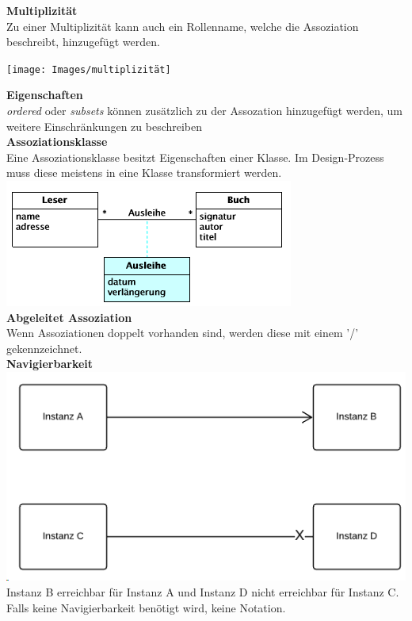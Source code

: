 \textbf{Multiplizität}\\
Zu einer Multiplizität kann auch ein Rollenname, welche die Assoziation beschreibt, hinzugefügt werden.
\begin{center}
	\texttt{[image: Images/multiplizität]}
\end{center}

\textbf{Eigenschaften}\\
\textit{ordered} oder \textit{subsets} können zusätzlich zu der Assozation hinzugefügt werden, um weitere Einschränkungen zu beschreiben\\

\textbf{Assoziationsklasse}\\
Eine Assoziationsklasse besitzt Eigenschaften einer Klasse. Im Design-Prozess muss diese meistens in eine Klasse transformiert werden.
\includegraphics[width=\columnwidth]{Images/assoziationsklasse}\\

\textbf{Abgeleitet Assoziation}\\
Wenn Assoziationen doppelt vorhanden sind,  werden diese mit einem '/' gekennzeichnet.\\

\textbf{Navigierbarkeit}\\
\includegraphics[width=\columnwidth]{Images/navigierbarkeit}
Instanz B erreichbar für Instanz A und Instanz D nicht erreichbar für Instanz C. Falls keine Navigierbarkeit benötigt wird, keine Notation.

